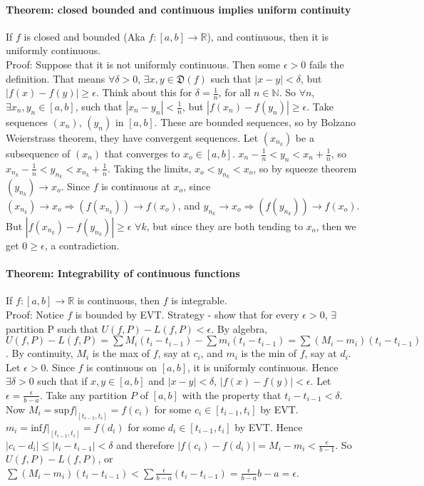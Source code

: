 \documentclass[10pt,letter]{article}
\begin{document}
\paragraph{Theorem: closed bounded and continuous implies uniform continuity}
If $f$ is closed and bounded (Aka $f:[a,b]\rightarrow\mathbb{R}$), and continuous, then it is uniformly continuous. \\ 
Proof: Suppose that it is not uniformly continuous. Then some $\epsilon>0$ fails the definition. That means $\forall\delta>0$, $\exists x,y\in\mathfrak{D}(f)$ such that $|x-y|<\delta$, but $|f(x)-f(y)|\geq\epsilon$. Think about this for $\delta=\frac{1}{n}$, for all $n\in\mathbb{N}$. So $\forall n$, $\exists x_n, y_n\in[a,b]$, such that $|x_n-y_n|<\frac{1}{n}$, but $|f(x_n)-f(y_n)|\geq\epsilon$. Take sequences $(x_n)$, $(y_n)$ in $[a,b]$. These are bounded sequences, so by Bolzano Weierstrass theorem, they have convergent sequences. Let $(x_{n_k})$ be a subsequence of $(x_n)$ that converges to $x_o\in[a,b]$. $x_n-\frac{1}{n}<y_n<x_n+\frac{1}{n}$, so $x_{n_k}-\frac{1}{n}<y_{n_k}<x_{n_k}+\frac{1}{n}$. Taking the limits, $x_o<y_{n_k}<x_o$, so by squeeze theorem $(y_{n_k})\rightarrow x_o$. Since $f$ is continuous at $x_o$, since $(x_{n_k})\rightarrow x_o\Rightarrow(f(x_{n_k}))\rightarrow f(x_o)$, and $y_{n_k}\rightarrow x_o\Rightarrow(f(y_{n_k}))\rightarrow f(x_o)$. But $|f(x_{n_k})-f(y_{n_k})|\geq \epsilon$ $\forall k$, but since they are both tending to $x_o$, then we get $0\geq\epsilon$, a contradiction. 

\paragraph{Theorem: Integrability of continuous functions}
If $f:[a,b]\rightarrow\mathbb{R}$ is continuous, then $f$ is integrable. \\ 
Proof: Notice $f$ is bounded by EVT. Strategy - show that for every $\epsilon>0$, $\exists$ partition P such that $U(f,P)-L(f,P)<\epsilon$. By algebra, $U(f,P)-L(f,P)=\sum M_i(t_i-t_{i-1})-\sum m_i(t_i-t_{i-1})=\sum (M_i-m_i)(t_i-t_{i-1})$. By continuity, $M_i$ is the max of $f$, say at $c_i$, and $m_i$ is the min of $f$, say at $d_i$. \\ 
Let $\epsilon>0$. Since $f$ is continuous on $[a,b]$, it is uniformly continuous. Hence $\exists\delta>0$ such that if $x,y\in[a,b]$ and $|x-y|<\delta$, $|f(x)-f(y)|<\epsilon$. Let $\epsilon=\frac{\epsilon}{b-a}$. Take any partition $P$ of $[a,b]$ with the property that $t_i-t_{i-1}<\delta$. Now $M_i=\text{sup}f|_{[t_{i-1},t_i]}=f(c_i)$ for some $c_i\in[t_{i-1},t_i]$ by EVT. $m_i=\text{inf}f|_{[t_{i-1},t_i]}=f(d_i)$ for some $d_i\in[t_{i-1},t_i]$ by EVT. Hence $|c_i-d_i|\leq|t_i-t_{i-1}|<\delta$ and therefore $|f(c_i)-f(d_i)|=M_i-m_i<\frac{\epsilon}{b-1}$. So $U(f,P)-L(f,P)$, or $\sum (M_i-m_i)(t_i-t_{i-1})<\sum \frac{\epsilon}{b-a}(t_i-t_{i-1})=\frac{\epsilon}{b-a}{b-a}=\epsilon$.
\end{document}
